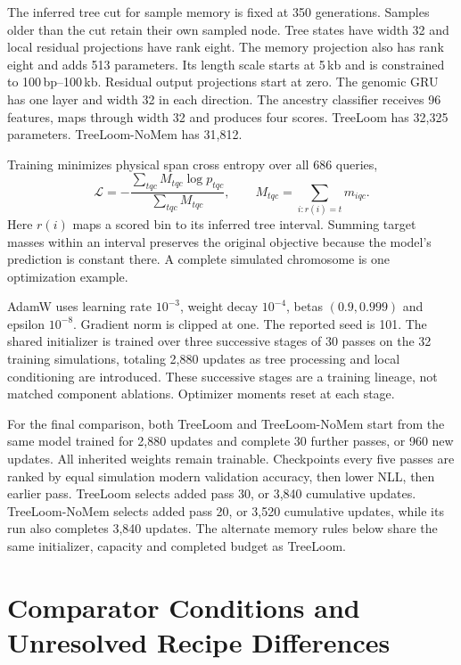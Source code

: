 \documentclass[letterpaper]{article}
\begin{document}
The inferred tree cut for sample memory is fixed at 350 generations. Samples older than the cut retain their own sampled node. Tree states have width 32 and local residual projections have rank eight. The memory projection also has rank eight and adds 513 parameters. Its length scale starts at 5\,kb and is constrained to 100\,bp--100\,kb. Residual output projections start at zero. The genomic GRU has one layer and width 32 in each direction. The ancestry classifier receives 96 features, maps through width 32 and produces four scores. TreeLoom has 32,325 parameters. TreeLoom-NoMem has 31,812.

Training minimizes physical span cross entropy over all 686 queries,
\begin{equation}
\mathcal L=
-\frac{\sum_{tqc}M_{tqc}\log p_{tqc}}{\sum_{tqc}M_{tqc}},
\qquad
M_{tqc}=\sum_{i:r(i)=t}m_{iqc}.
\end{equation}
Here $r(i)$ maps a scored bin to its inferred tree interval. Summing target masses within an interval preserves the original objective because the model's prediction is constant there. A complete simulated chromosome is one optimization example.

AdamW uses learning rate $10^{-3}$, weight decay $10^{-4}$, betas $(0.9,0.999)$ and epsilon $10^{-8}$. Gradient norm is clipped at one. The reported seed is 101. The shared initializer is trained over three successive stages of 30 passes on the 32 training simulations, totaling 2,880 updates as tree processing and local conditioning are introduced. These successive stages are a training lineage, not matched component ablations. Optimizer moments reset at each stage.

For the final comparison, both TreeLoom and TreeLoom-NoMem start from the same model trained for 2,880 updates and complete 30 further passes, or 960 new updates. All inherited weights remain trainable. Checkpoints every five passes are ranked by equal simulation modern validation accuracy, then lower NLL, then earlier pass. TreeLoom selects added pass 30, or 3,840 cumulative updates. TreeLoom-NoMem selects added pass 20, or 3,520 cumulative updates, while its run also completes 3,840 updates. The alternate memory rules below share the same initializer, capacity and completed budget as TreeLoom.

\section{Comparator Conditions and Unresolved Recipe Differences}
\label{app:comparators}
\end{document}
